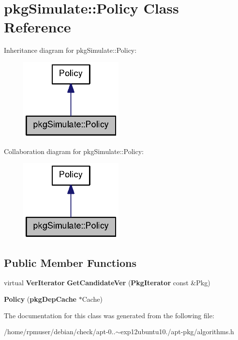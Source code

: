 \section{pkg\-Simulate\-:\-:\-Policy \-Class \-Reference}
\label{classpkgSimulate_1_1Policy}


\-Inheritance diagram for pkg\-Simulate\-:\-:\-Policy\-:
\nopagebreak
\begin{figure}[H]
\begin{center}
\leavevmode
\includegraphics[width=148pt]{classpkgSimulate_1_1Policy__inherit__graph}
\end{center}
\end{figure}


\-Collaboration diagram for pkg\-Simulate\-:\-:\-Policy\-:
\nopagebreak
\begin{figure}[H]
\begin{center}
\leavevmode
\includegraphics[width=148pt]{classpkgSimulate_1_1Policy__coll__graph}
\end{center}
\end{figure}
\subsection*{\-Public \-Member \-Functions}
\begin{DoxyCompactItemize}
\item 
virtual {\bf \-Ver\-Iterator} {\bfseries \-Get\-Candidate\-Ver} ({\bf \-Pkg\-Iterator} const \&\-Pkg)\label{classpkgSimulate_1_1Policy_a19accc4f28e2cfc71b57aaf0ffcb9d95}

\item 
{\bfseries \-Policy} ({\bf pkg\-Dep\-Cache} $\ast$\-Cache)\label{classpkgSimulate_1_1Policy_ac7005f1179db07d107334201f56a84c2}

\end{DoxyCompactItemize}


\-The documentation for this class was generated from the following file\-:\begin{DoxyCompactItemize}
\item 
/home/rpmuser/debian/check/apt-\/0..$\sim$exp12ubuntu10./apt-\/pkg/algorithms.\-h\end{DoxyCompactItemize}
